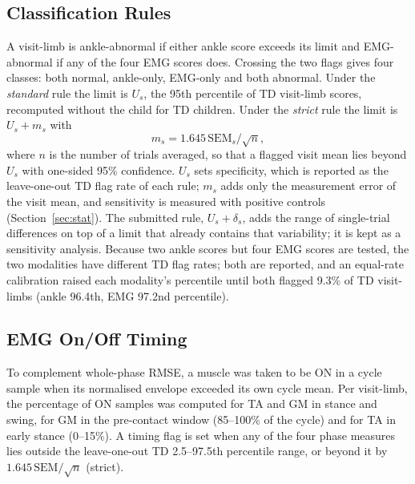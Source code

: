 \documentclass[conference]{IEEEtran}
\newcommand{\rtwo}[1]{{\color{rII}#1}}
\newcommand{\rthree}[1]{{\color{rIII}#1}}
\newcommand{\rfour}[1]{{\color{rIV}#1}}
\newcommand{\rtwo}[1]{#1}
\newcommand{\rthree}[1]{#1}
\newcommand{\rfour}[1]{#1}
\begin{document}
\subsection{Classification Rules}
A visit-limb is ankle-abnormal if either ankle score exceeds its limit and EMG-abnormal if any of the four EMG scores does. Crossing the two flags gives four classes: both normal, ankle-only, EMG-only and both abnormal. Under the \emph{standard} rule the limit is $U_s$, the 95th percentile of TD visit-limb scores, recomputed without the child for TD children. \rtwo{Under the \emph{strict} rule the limit is $U_s+m_s$ with
\begin{equation}
m_s=1.645\,\mathrm{SEM}_s/\sqrt{n},
\end{equation}
where $n$ is the number of trials averaged, so that a flagged visit mean lies beyond $U_s$ with one-sided 95\% confidence.} \rthree{$U_s$ sets specificity, which is reported as the leave-one-out TD flag rate of each rule; $m_s$ adds only the measurement error of the visit mean, and sensitivity is measured with positive controls (Section~\ref{sec:stat}).} \rtwo{The submitted rule, $U_s+\delta_s$, adds the range of single-trial differences on top of a limit that already contains that variability; it is kept as a sensitivity analysis.} \rfour{Because two ankle scores but four EMG scores are tested, the two modalities have different TD flag rates; both are reported, and an equal-rate calibration raised each modality's percentile until both flagged 9.3\% of TD visit-limbs (ankle 96.4th, EMG 97.2nd percentile).}

\subsection{EMG On/Off Timing}
\rthree{To complement whole-phase RMSE, a muscle was taken to be ON in a cycle sample when its normalised envelope exceeded its own cycle mean. Per visit-limb, the percentage of ON samples was computed for TA and GM in stance and swing, for GM in the pre-contact window (85--100\% of the cycle) and for TA in early stance (0--15\%). A timing flag is set when any of the four phase measures lies outside the leave-one-out TD 2.5--97.5th percentile range, or beyond it by $1.645\,\mathrm{SEM}/\sqrt{n}$ (strict).}
\end{document}
